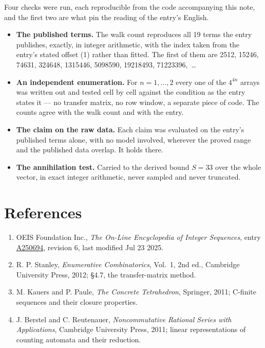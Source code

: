 \documentclass[11pt]{article}
\theoremstyle{definition}
\begin{document}
Four checks were run, each reproducible from the code accompanying this note, and the first two are what pin the reading of the entry's English.

\begin{itemize}

\item {\bfseries The published terms.} The walk count reproduces all 19 terms the entry publishes, exactly, in integer arithmetic, with the index taken from the entry's stated offset (1) rather than fitted. The first of them are 2512, 15246, 74631, 324648, 1315446, 5098590, 19218493, 71223396,~\dots

\item {\bfseries An independent enumeration.} For $n = 1,\dots,2$ every one of the $4^{4n}$ arrays was written out and tested cell by cell against the condition as the entry states it --- no transfer matrix, no row window, a separate piece of code. The counts agree with the walk count and with the entry.

\item {\bfseries The claim on the raw data.} Each claim was evaluated on the entry's published terms alone, with no model involved, wherever the proved range and the published data overlap. It holds there.

\item {\bfseries The annihilation test.} Carried to the derived bound $S = 33$ over the whole vector, in exact integer arithmetic, never sampled and never truncated.

\end{itemize}

\section{References}

\begin{enumerate}

\item OEIS Foundation Inc., \emph{The On-Line Encyclopedia of Integer Sequences}, entry \href{https://oeis.org/A250694}{A250694}, revision 6, last modified Jul 23 2025.

\item R. P. Stanley, \emph{Enumerative Combinatorics}, Vol.~1, 2nd ed., Cambridge University Press, 2012; \S4.7, the transfer-matrix method.

\item M. Kauers and P. Paule, \emph{The Concrete Tetrahedron}, Springer, 2011; C-finite sequences and their closure properties.

\item J. Berstel and C. Reutenauer, \emph{Noncommutative Rational Series with Applications}, Cambridge University Press, 2011; linear representations of counting automata and their reduction.

\end{enumerate}
\end{document}
